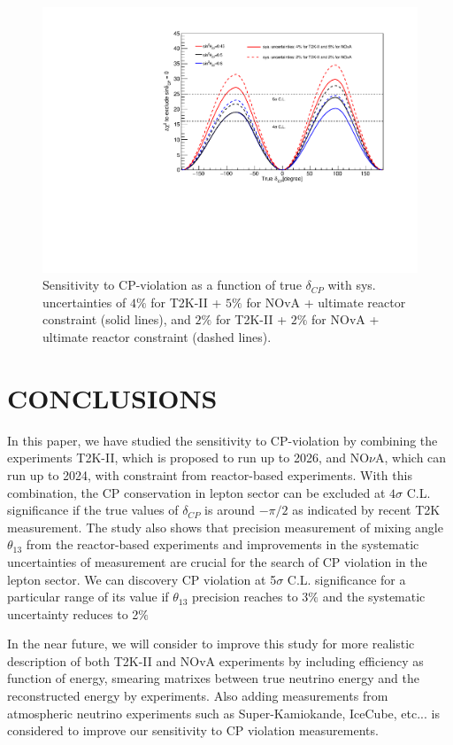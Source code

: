 \documentclass[a4 paper,12pt]{report}%
\def\Mr{\uppercase}
\begin{document}
  \begin{figure}
 	\centering
 	\includegraphics[scale=0.5]{improve_sys.pdf} 
 	\caption{\label{fig:ultisen} Sensitivity to CP-violation as a function of true $\delta_{CP}$ with sys. uncertainties of $4\%$ for T2K-II + $5\%$ for NOvA + ultimate reactor constraint (solid lines), and $2\%$ for T2K-II + $2\%$ for NOvA + ultimate reactor constraint (dashed lines). } 
 \end{figure}

\section{\Mr{Conclusions}}
In this paper, we have studied the sensitivity to CP-violation by combining the experiments T2K-II, which is proposed to run up to 2026, and NO$\nu$A, which can run up to 2024, with constraint from reactor-based experiments. With this combination, the CP conservation in lepton sector can be excluded at $4\sigma$ C.L. significance if the true values of $\delta_{CP}$ is around $-\pi/2$ as indicated by recent T2K measurement. The study also shows that precision measurement of mixing angle $\theta_{13}$ from the reactor-based experiments and improvements in the systematic uncertainties of measurement  are crucial for the search of CP violation in the lepton sector. We can discovery CP violation at 5$\sigma$ C.L. significance for a particular range of its value if $\theta_{13}$ precision reaches to 3$\%$ and the systematic uncertainty reduces to 2$\%$ \par 
In the near future, we will consider to improve this study for more realistic description of both T2K-II and NOvA experiments by including efficiency as function of energy, smearing matrixes between true neutrino energy and the reconstructed energy by experiments. Also adding measurements from atmospheric neutrino experiments such as Super-Kamiokande, IceCube, etc... is considered to improve our sensitivity to CP violation measurements.\par 
\end{document}

